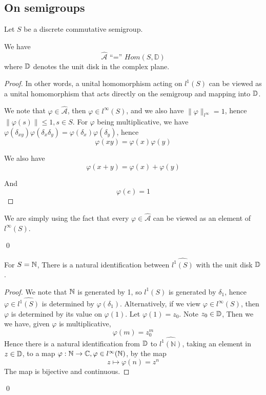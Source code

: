 \subsection{On semigroups}
Let $S$ be a discrete commutative semigroup.
\begin{proposition}
    We have
    \begin{equation*}
        \widehat{\mathcal{A}} \text{ ``='' } Hom (S,\mathbb{D})
    \end{equation*}
    where $\mathbb{D}$ denotes the unit disk in the complex plane.
\end{proposition}
\begin{proof}
    In other words, a unital homomorphism acting on $l^1(S)$ can be viewed as a unital homomorphism that acts directly on the semigroup and mapping into $\mathbb{D}$.

    We note that $\varphi\in\widehat{\mathcal{A}}$, then $\varphi\in l^\infty(S)$, and we also have $\|\varphi\|_{l^\infty}=1$, hence $\|\varphi(s)\|\leq 1, s\in S$. For $\varphi$ being multiplicative, we have $\varphi(\delta_{xy})\varphi(\delta_x\delta_y)=\varphi(\delta_x)\varphi(\delta_y)$, hence
    \begin{equation*}
        \varphi(xy)=\varphi(x)\varphi(y)
    \end{equation*}

    We also have
    \begin{equation*}
        \varphi(x+y)=\varphi(x)+\varphi(y)
    \end{equation*}

    And
    \begin{equation*}
        \varphi(e)=1
    \end{equation*}

\end{proof}
\begin{remark}
    We are simply using the fact that every $\varphi\in\widehat{\mathcal{A}}$ can be viewed as an element of $l^\infty(S)$.
\end{remark}
\qed


\begin{proposition}
    For $S=\mathbb{N}$, There is a natural identification between $\widehat{l^1(S)}$ with the unit disk $\mathbb{D}$.
\end{proposition}
\begin{proof}
    We note that $\mathbb{N}$ is generated by 1, so $l^1(S)$ is generated by $\delta_1$, hence $\varphi\in \widehat{l^1(S)}$ is determined by $\varphi(\delta_1)$. Alternatively, if we view $\varphi\in l^\infty(S)$, then $\varphi$ is determined by its value on $\varphi(1)$. Let $\varphi(1)=z_0$. Note $z_0\in\mathbb{D}$, Then we we have, given $\varphi$ is multiplicative,
    \begin{equation*}
        \varphi(m)=z_0^m
    \end{equation*}
    Hence there is a natural identification from $\mathbb{D}$ to $\widehat{l^1(\mathbb{N})}$, taking an element in $z\in\mathbb{D}$, to a map $\varphi:\mathbb{N}\to\mathbb{C}, \varphi\in l^\infty(\mathbb{N})$, by the map
    \begin{equation*}
        z\mapsto \varphi(n)=z^n
    \end{equation*}
    The map is bijective and continuous.
\end{proof}
\qed

